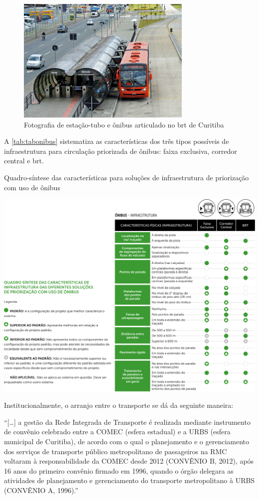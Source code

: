 	\begin{figure}
		\centering
		\caption{Fotografia de estação-tubo e ônibus articulado no \gls{brt} de Curitiba}
		\label{fig:brtsul}
		\includegraphics[width=0.55\linewidth]{img/guiatpc2018a_03}
	\end{figure}

	A \autoref{tab:tabonibus} sistematiza as características dos três tipos possíveis de infraestrutura para circulação priorizada de ônibus: faixa exclusiva, corredor central e \gls{brt}.
	
	\begin{landscape}
		\begin{table}
			\centering
			\caption{Quadro-síntese das características para soluções de infraestrutura de priorização com uso de ônibus}
			\label{tab:tabonibus}
			\includegraphics[width=0.75\linewidth]{img/guiatpc2018a_02}
		\end{table}
	\end{landscape}
		
	Institucionalmente, o arranjo entre o transporte se dá da seguinte maneira:
	
	\begin{citacao}
		``[\dots] a gestão da Rede Integrada de Transporte é realizada mediante instrumento de convênio celebrado entre a COMEC (esfera estadual) e a URBS (esfera municipal de Curitiba), de acordo com o qual o planejamento e o gerenciamento dos serviços de transporte público metropolitano de passageiros na RMC voltaram à responsabilidade da COMEC desde 2012 (CONVÊNIO B, 2012), após 16 anos do primeiro convênio firmado em 1996, quando o órgão delegara as atividades de planejamento e gerenciamento do transporte metropolitano à URBS (CONVÊNIO A, 1996).'' \cite[p. 386]{paese2014a}
	\end{citacao}

